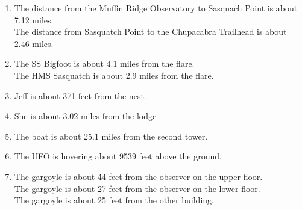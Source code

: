 \documentclass{ximera}
\begin{document}
\begin{enumerate}
\item The distance from the Muffin Ridge Observatory to Sasquach Point is about 7.12 miles.\\
The distance from Sasquatch Point to the Chupacabra Trailhead is about 2.46 miles.

\item  The SS Bigfoot is about 4.1 miles from the flare. \\
The HMS Sasquatch is about 2.9 miles from the flare.

\item  Jeff is about 371 feet from the nest.

\item  She is about 3.02 miles from the lodge

\item  The boat is about 25.1 miles from the second tower.

\item  The UFO is hovering about 9539 feet above the ground.

\item The gargoyle is about 44 feet from the observer on the upper floor. \\
The gargoyle is about 27 feet from the observer on the lower floor. \\
The gargoyle is about 25 feet from the other building.

\setcounter{HW}{\value{enumi}}
\end{enumerate}
\end{document}
